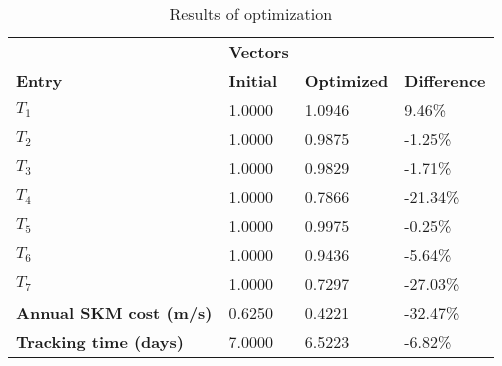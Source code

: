 \begin{table}[H]
\centering
\begin{tabular}{llll}
\textbf{}      & \cellcolor[HTML]{EFEFEF}\textbf{Vectors} & \textbf{} & \textbf{}         \\
\rowcolor[HTML]{EFEFEF} 
\textbf{Entry} & \textbf{Initial} & \textbf{Optimized} & \textbf{Difference} \\
$T_1$ & 1.0000 & 1.0946 & 9.46\% \\ 
$T_2$ & 1.0000 & 0.9875 & -1.25\% \\ 
$T_3$ & 1.0000 & 0.9829 & -1.71\% \\ 
$T_4$ & 1.0000 & 0.7866 & -21.34\% \\ 
$T_5$ & 1.0000 & 0.9975 & -0.25\% \\ 
$T_6$ & 1.0000 & 0.9436 & -5.64\% \\ 
$T_7$ & 1.0000 & 0.7297 & -27.03\% \\ 
\rowcolor[HTML]{EFEFEF} 
\textbf{Annual SKM cost (m/s)}  & 0.6250 & 0.4221 & -32.47\% \\ 
\rowcolor[HTML]{EFEFEF} 
\textbf{Tracking time (days)}  & 7.0000 & 6.5223 & -6.82\% \\ 
\end{tabular}
\caption{Results of optimization}
\label{tab:OptimizationAnalysis}
\end{table}